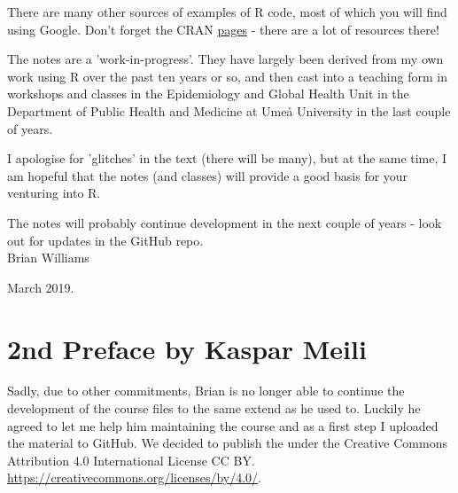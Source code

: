 \documentclass[titlepage]{book}
\begin{document}
There are many other sources of examples of R code, most of which you will find using Google. Don't forget the CRAN \href{https://cran.r-project.org/}{pages} - there are a lot of resources there! 

The notes are a 'work-in-progress'.  They have largely been derived from my own work using R over the past ten years or so, and then cast into a teaching form in workshops and classes in the Epidemiology and Global Health Unit in the Department of Public Health and Medicine at Umeå University in the last couple of years.

I apologise for 'glitches' in the text (there will be many), but at the same time, I am hopeful that the notes (and classes) will provide a good basis for your venturing into R.

The notes will probably continue development in the next couple of years - look out for updates in the GitHub repo. \\


Brian Williams
 
 
March 2019.


\section{2nd Preface by Kaspar Meili}

Sadly, due to other commitments, Brian is no longer able to continue the development of the course files to the same extend as he used to. Luckily he agreed to let me help him maintaining the course and as a first step I uploaded the material to GitHub. We decided to publish the under the Creative Commons Attribution 4.0 International License CC BY. \url{https://creativecommons.org/licenses/by/4.0/}. 
\end{document}
